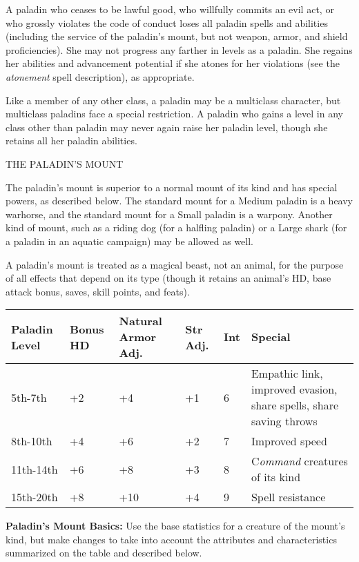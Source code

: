 \documentclass{article}
\begin{document}
A paladin who ceases to be lawful good, who willfully commits an evil act, or who 
grossly violates the code of conduct loses all paladin spells and abilities (including 
the service of the paladin's mount, but not weapon, armor, and shield proficiencies). 
She may not progress any farther in levels as a paladin. She regains her abilities 
and advancement potential if she atones for her violations (see the \textit{atonement 
}spell description), as appropriate.

Like a member of any other class, a paladin may be a multiclass character, but 
multiclass paladins face a special restriction. A paladin who gains a level in 
any class other than paladin may never again raise her paladin level, though she 
retains all her paladin abilities.

\vspace{12pt}
THE PALADIN'S MOUNT

The paladin's mount is superior to a normal mount of its kind and has special powers, 
as described below. The standard mount for a Medium paladin is a heavy warhorse, 
and the standard mount for a Small paladin is a warpony. Another kind of mount, 
such as a riding dog (for a halfling paladin) or a Large shark (for a paladin in 
an aquatic campaign) may be allowed as well.

A paladin's mount is treated as a magical beast, not an animal, for the purpose 
of all effects that depend on its type (though it retains an animal's HD, base 
attack bonus, saves, skill points, and feats).

\vspace{12pt}
\begin{tabular}{|>{\raggedright}p{40pt}|>{\raggedright}p{30pt}|>{\raggedright}p{56pt}|>{\raggedright}p{17pt}|>{\raggedright}p{13pt}|>{\raggedright}p{120pt}|}
\hline
P\textbf{aladin Level } & B\textbf{onus HD } & N\textbf{atural Armor Adj. } & S\textbf{tr 
Adj. } & I\textbf{nt } & S\textbf{pecial}\tabularnewline
\hline
5th-7th  & +2  & +4  & +1  & 6  & Empathic link, improved evasion, share spells, 
share saving throws\tabularnewline
\hline
8th-10th  & +4  & +6  & +2  & 7  & Improved speed\tabularnewline
\hline
11th-14th  & +6  & +8  & +3  & 8  & C\textit{ommand }creatures of its kind\tabularnewline
\hline
15th-20th  & +8  & +10  & +4  & 9  & Spell resistance\tabularnewline
\hline
\end{tabular}

\vspace{12pt}
\textbf{Paladin's Mount Basics: }Use the base statistics for a creature of the 
mount's kind,\textit{ }but make changes to take into account the attributes and 
characteristics summarized on the table and described below.
\end{document}
